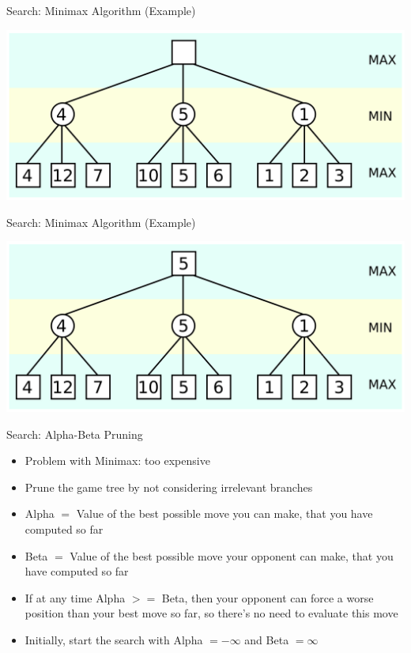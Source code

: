 \documentclass[xcolor=pdftex,dvipsnames,table]{beamer}
\begin{document}
\begin{frame}{Search: Minimax Algorithm (Example)}
\begin{center}
\includegraphics[width=\textwidth,height=\textheight,keepaspectratio]{minimax2.png}
\end{center}
\end{frame}

\begin{frame}{Search: Minimax Algorithm (Example)}
\begin{center}
\includegraphics[width=\textwidth,height=\textheight,keepaspectratio]{minimax.png}
\end{center}
\end{frame}

\begin{frame}[fragile]{Search: Alpha-Beta Pruning}
\begin{itemize}
\item Problem with Minimax: too expensive
\item Prune the game tree by not considering irrelevant branches
\item Alpha $=$ Value of the best possible move you can make, that you have computed so far
\item Beta $=$ Value of the best possible move your opponent can make, that you have computed so far
\item If at any time Alpha $>=$ Beta, then your opponent can force a worse position than your best move so far, so there's no need to evaluate this move
\item Initially, start the search with Alpha $= -\infty$ and Beta $= \infty$
\end{itemize}
\end{frame}
\end{document}
